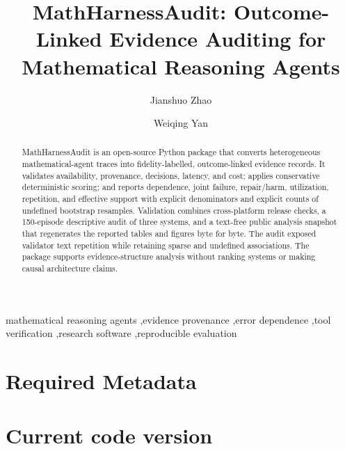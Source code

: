 \documentclass[preprint,12pt,a4paper]{elsarticle}
\begin{document}
\renewcommand{\labelenumii}{\arabic{enumi}.\arabic{enumii}}

\begin{frontmatter}

\title{MathHarnessAudit: Outcome-Linked Evidence Auditing for Mathematical Reasoning Agents}

\author[ytu]{Jianshuo Zhao}
\author[ytu]{Weiqing Yan}

\address[ytu]{School of Computer and Control Engineering, Yantai University,
Yantai, China}

\begin{abstract}
MathHarnessAudit is an open-source Python package that converts heterogeneous
mathematical-agent traces into fidelity-labelled, outcome-linked evidence
records. It validates availability, provenance, decisions, latency, and cost;
applies conservative deterministic scoring; and reports dependence, joint
failure, repair/harm, utilization, repetition, and effective support with
explicit denominators and explicit counts of undefined bootstrap resamples.
Validation combines cross-platform release checks, a
150-episode descriptive audit of three systems, and a text-free public analysis
snapshot that regenerates the reported tables and figures byte for byte. The
audit exposed validator text repetition while retaining sparse and undefined
associations. The package supports evidence-structure analysis without ranking
systems or making causal architecture claims.
\end{abstract}

\begin{keyword}
mathematical reasoning agents \sep evidence provenance \sep error dependence
\sep tool verification \sep research software \sep reproducible evaluation
\end{keyword}

\end{frontmatter}

\section*{Required Metadata}

\section*{Current code version}
\end{document}
